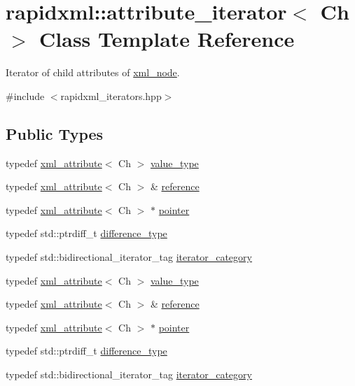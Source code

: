 \hypertarget{classrapidxml_1_1attribute__iterator}{}\section{rapidxml\+:\+:attribute\+\_\+iterator$<$ Ch $>$ Class Template Reference}
\label{classrapidxml_1_1attribute__iterator}


Iterator of child attributes of \mbox{\hyperlink{classrapidxml_1_1xml__node}{xml\+\_\+node}}.  




{\ttfamily \#include $<$rapidxml\+\_\+iterators.\+hpp$>$}

\subsection*{Public Types}
\begin{DoxyCompactItemize}
\item 
typedef \mbox{\hyperlink{classrapidxml_1_1xml__attribute}{xml\+\_\+attribute}}$<$ Ch $>$ \mbox{\hyperlink{classrapidxml_1_1attribute__iterator_ad4280d358828ad9c3eb1a787decb162e}{value\+\_\+type}}
\item 
typedef \mbox{\hyperlink{classrapidxml_1_1xml__attribute}{xml\+\_\+attribute}}$<$ Ch $>$ \& \mbox{\hyperlink{classrapidxml_1_1attribute__iterator_a097343e44557de14de86b470d3f917d9}{reference}}
\item 
typedef \mbox{\hyperlink{classrapidxml_1_1xml__attribute}{xml\+\_\+attribute}}$<$ Ch $>$ $\ast$ \mbox{\hyperlink{classrapidxml_1_1attribute__iterator_a69acc2e60270d6a062c03c9cb1cf2aa7}{pointer}}
\item 
typedef std\+::ptrdiff\+\_\+t \mbox{\hyperlink{classrapidxml_1_1attribute__iterator_accfd6d8527d32b427496b42f71a2e37a}{difference\+\_\+type}}
\item 
typedef std\+::bidirectional\+\_\+iterator\+\_\+tag \mbox{\hyperlink{classrapidxml_1_1attribute__iterator_a97ac5d8b98f5b03c68cc566f5ac0a9e0}{iterator\+\_\+category}}
\item 
typedef \mbox{\hyperlink{classrapidxml_1_1xml__attribute}{xml\+\_\+attribute}}$<$ Ch $>$ \mbox{\hyperlink{classrapidxml_1_1attribute__iterator_ad4280d358828ad9c3eb1a787decb162e}{value\+\_\+type}}
\item 
typedef \mbox{\hyperlink{classrapidxml_1_1xml__attribute}{xml\+\_\+attribute}}$<$ Ch $>$ \& \mbox{\hyperlink{classrapidxml_1_1attribute__iterator_a097343e44557de14de86b470d3f917d9}{reference}}
\item 
typedef \mbox{\hyperlink{classrapidxml_1_1xml__attribute}{xml\+\_\+attribute}}$<$ Ch $>$ $\ast$ \mbox{\hyperlink{classrapidxml_1_1attribute__iterator_a69acc2e60270d6a062c03c9cb1cf2aa7}{pointer}}
\item 
typedef std\+::ptrdiff\+\_\+t \mbox{\hyperlink{classrapidxml_1_1attribute__iterator_accfd6d8527d32b427496b42f71a2e37a}{difference\+\_\+type}}
\item 
typedef std\+::bidirectional\+\_\+iterator\+\_\+tag \mbox{\hyperlink{classrapidxml_1_1attribute__iterator_a97ac5d8b98f5b03c68cc566f5ac0a9e0}{iterator\+\_\+category}}
\end{DoxyCompactItemize}
